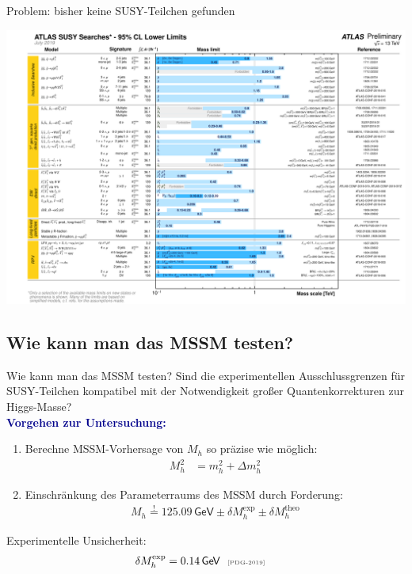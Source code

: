 \documentclass[hyperref={pdfpagelabels=false},ngerman]{beamer}
\newcommand{\eh}[1]{\,\mathsf{#1}}
\newcommand{\mycite}[1]{\ensuremath{\text{\textcolor{darkgray}{\tiny [#1]}}}}
\renewcommand{\emph}[1]{\textbf{\textcolor{darkblue}{#1}}}
\newcommand{\GeV}{\eh{GeV}}
\begin{document}
\begin{frame}{Problem: bisher keine SUSY-Teilchen gefunden}
  \begin{center}
    \includegraphics[width=\textwidth]{images/ATLAS_SUSY_Summary}
  \end{center}
\end{frame}

\subsection{Wie kann man das MSSM testen?}

\begin{frame}{Wie kann man das MSSM testen?}
  Sind die experimentellen Ausschlussgrenzen für SUSY-Teilchen kompatibel mit
  der Notwendigkeit großer Quantenkorrekturen zur Higgs-Masse?\\[1em]
  \emph{Vorgehen zur Untersuchung:}
  \begin{enumerate}
  \item Berechne MSSM-Vorhersage von $M_h$ so präzise wie möglich:
  \begin{align*}
    M_h^2 &= m_h^2 + \Delta m_h^2
  \end{align*}
  \item Einschränkung des Parameterraums des MSSM durch Forderung:
    \begin{align*}
      M_h \overset{!}{=} 125.09 \GeV \pm \delta M_h^{\text{exp}} \pm \delta M_h^{\text{theo}}
    \end{align*}
  \end{enumerate}
  Experimentelle Unsicherheit:
  \begin{align*}
    \delta M_h^{\text{exp}} &= 0.14\eh{GeV} \ \ \mycite{PDG-2019}
  \end{align*}
\end{frame}
\end{document}
